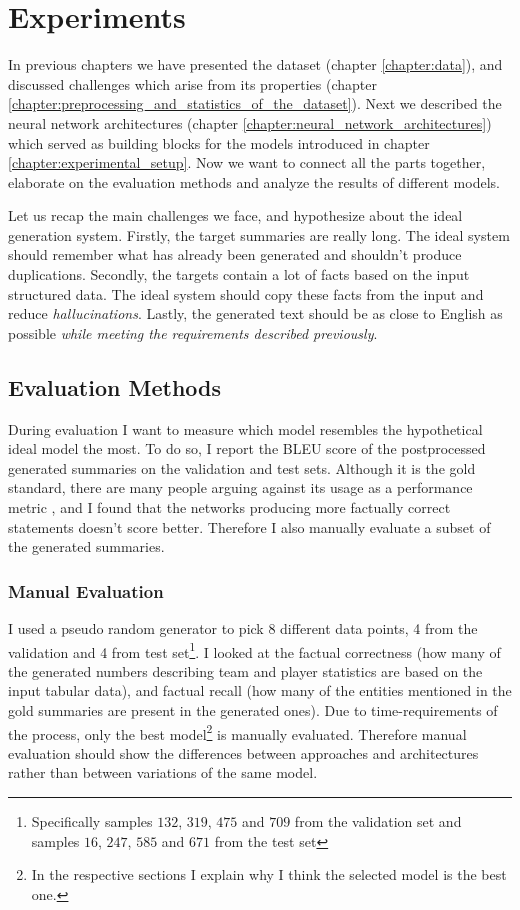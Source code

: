 \chapter{Experiments} \label{chapter:experiments}

In previous chapters we have presented the dataset (chapter \ref{chapter:data}), and discussed challenges which arise from its properties (chapter \ref{chapter:preprocessing_and_statistics_of_the_dataset}). Next we described the neural network architectures (chapter \ref{chapter:neural_network_architectures}) which served as building blocks for the models introduced in chapter \ref{chapter:experimental_setup}. Now we want to connect all the parts together, elaborate on the evaluation methods and analyze the results of different models.

Let us recap the main challenges we face, and hypothesize about the ideal generation system. Firstly, the target summaries are really long. The ideal system should remember what has already been generated and shouldn't produce duplications. Secondly, the targets contain a lot of facts based on the input structured data. The ideal system should copy these facts from the input and reduce \emph{hallucinations}. Lastly, the generated text should be as close to English as possible \emph{while meeting the requirements described previously}.

\section{Evaluation Methods}

During evaluation I want to measure which model resembles the hypothetical ideal model the most. To do so, I report the BLEU score \citep{papineni2002} of the postprocessed generated summaries on the validation and test sets. Although it is the gold standard, there are many people arguing against its usage as a performance metric \citep{celikyilmaz2021evaluation}, and I found that the networks producing more factually correct statements doesn't score better. Therefore I also manually evaluate a subset of the generated summaries.

\subsection{Manual Evaluation}

I used a pseudo random generator to pick 8 different data points, 4 from the validation and 4 from test set\footnote{Specifically samples $132$, $319$, $475$ and $709$ from the validation set and samples $16$, $247$, $585$ and $671$ from the test set}. I looked at the factual correctness (how many of the generated numbers describing team and player statistics are based on the input tabular data), and factual recall (how many of the entities mentioned in the gold summaries are present in the generated ones). Due to time-requirements of the process, only the best model\footnote{In the respective sections I explain why I think the selected model is the best one.} is manually evaluated. Therefore manual evaluation should show the differences between approaches and architectures rather than between variations of the same model.

